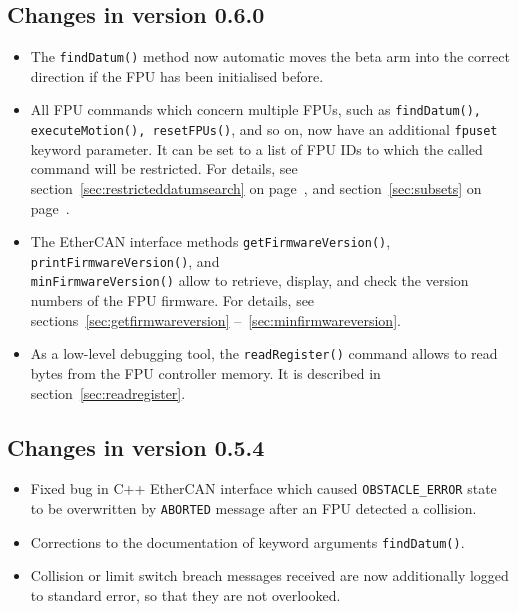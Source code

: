 \documentclass[11pt,a4paper]{report}
\begin{document}
\subsection*{Changes in version 0.6.0}
\begin{itemize}
\item The \texttt{findDatum()} method now automatic moves the beta
  arm into the correct direction if the FPU has been initialised before.
  
\item All FPU commands which concern multiple FPUs, such as
  \texttt{findDatum(), executeMotion(), resetFPUs()}, and so on, now
  have an additional \texttt{fpuset} keyword parameter. It can be set
  to a list of FPU IDs to which the called command will be
  restricted. For details, see section~\ref{sec:restricteddatumsearch}
  on page~\pageref{sec:restricteddatumsearch}, and
  section~\ref{sec:subsets} on page~\pageref{sec:subsets}.
  
\item The EtherCAN interface methods \texttt{getFirmwareVersion()},
  \texttt{printFirmwareVersion()}, and \\
  \texttt{minFirmwareVersion()}
  allow to retrieve, display, and check the version numbers of the FPU
  firmware. For details, see sections~\ref{sec:getfirmwareversion}
    --~\ref{sec:minfirmwareversion}.

\item As a low-level debugging tool, the \texttt{readRegister()}
  command allows to read bytes from the FPU controller memory.  It is
  described in section~\ref{sec:readregister}.
  
\end{itemize}



\subsection*{Changes in version 0.5.4}
\begin{itemize}
\item Fixed bug in C++ EtherCAN interface which caused \texttt{OBSTACLE\_ERROR}
  state to be overwritten by \texttt{ABORTED} message after an FPU
  detected a collision.
\item Corrections to the documentation of keyword arguments \texttt{findDatum()}.
\item Collision or limit switch breach messages received are now
  additionally logged to standard error, so that they are not overlooked.
\end{itemize}
\end{document}
